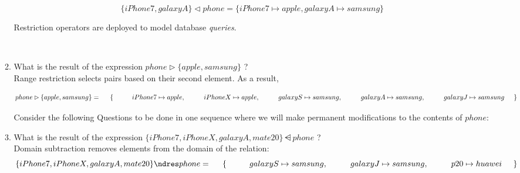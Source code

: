 \documentclass[12pt]{article}
\begin{document}
\begin{enumerate}
\begin{enumerate}
\[ \{ iPhone7, galaxyA \}  \lhd phone = \{ iPhone7 \mapsto apple, galaxyA \mapsto samsung \} \]


\noindent Restriction operators are deployed to model database \textit{queries}.


\ \\


\item What is the result of the expression  $phone \rhd \{ apple, samsung \}$ ?\\


\noindent Range restriction selects pairs based on their second element. As a result,

\[ 
phone \rhd \{ apple, samsung \} = \\

\hspace{5mm} \{ \\
\hspace{10mm} iPhone7 \mapsto apple,\\
\hspace{10mm} iPhoneX \mapsto apple,\\
\hspace{10mm} galaxyS \mapsto samsung,\\
\hspace{10mm} galaxyA \mapsto samsung,\\
\hspace{10mm} galaxyJ \mapsto samsung\\
\hspace{5mm} \}
\]


\newpage

\noindent Consider the following Questions to be done in one sequence where we will make permanent modifications to the contents of $phone$:\\


\item What is the result of the expression  $\{ iPhone7, iPhoneX, galaxyA, mate20 \} \ndres phone$ ?\\


\noindent  Domain subtraction removes elements from the domain of the relation:\\


\[
\{ iPhone7, iPhoneX, galaxyA, mate20 \} \ndres phone = \\

\hspace{5mm} \{ \\
\hspace{10mm} galaxyS \mapsto samsung,\\
\hspace{10mm} galaxyJ \mapsto samsung,\\
\hspace{10mm} p20 \mapsto huawei\\
\hspace{5mm} \}

\]
\end{enumerate}
\end{enumerate}
\end{document}
